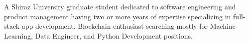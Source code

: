 

\begin{cvparagraph}

A Shiraz University graduate student dedicated to software engineering and product management having two or more years of expertise specializing in full-stack app development. Blockchain enthusiast searching mostly for Machine Learning, Data Engineer, and Python Development positions.
\end{cvparagraph}